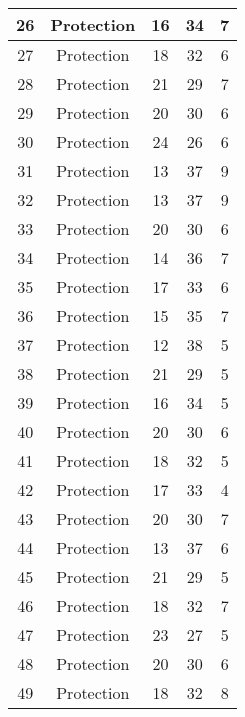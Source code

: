 \documentclass[results.tex]{subfiles}
\begin{document}
\begin{center}
\begin{tabular}{| c || c | c | c | c |}
    \hline
    26 & Protection & 16 & 34 & 7 \\ 
    \hline
    27 & Protection & 18 & 32 & 6 \\ 
    \hline
    28 & Protection & 21 & 29 & 7 \\ 
    \hline
    29 & Protection & 20 & 30 & 6 \\ 
    \hline
    30 & Protection & 24 & 26 & 6 \\ 
    \hline
    31 & Protection & 13 & 37 & 9 \\ 
    \hline
    32 & Protection & 13 & 37 & 9 \\ 
    \hline
    33 & Protection & 20 & 30 & 6 \\ 
    \hline
    34 & Protection & 14 & 36 & 7 \\ 
    \hline
    35 & Protection & 17 & 33 & 6 \\ 
    \hline
    36 & Protection & 15 & 35 & 7 \\ 
    \hline
    37 & Protection & 12 & 38 & 5 \\ 
    \hline
    38 & Protection & 21 & 29 & 5 \\ 
    \hline
    39 & Protection & 16 & 34 & 5 \\ 
    \hline
    40 & Protection & 20 & 30 & 6 \\ 
    \hline
    41 & Protection & 18 & 32 & 5 \\ 
    \hline
    42 & Protection & 17 & 33 & 4 \\ 
    \hline
    43 & Protection & 20 & 30 & 7 \\ 
    \hline
    44 & Protection & 13 & 37 & 6 \\ 
    \hline
    45 & Protection & 21 & 29 & 5 \\ 
    \hline
    46 & Protection & 18 & 32 & 7 \\ 
    \hline
    47 & Protection & 23 & 27 & 5 \\ 
    \hline
    48 & Protection & 20 & 30 & 6 \\ 
    \hline
    49 & Protection & 18 & 32 & 8 \\ 
    \hline   \end{tabular}
\end{center}
\end{document}
